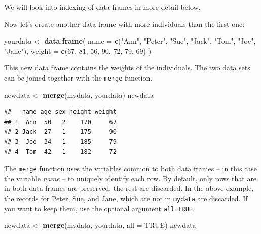 \documentclass[
]{book}
\newenvironment{Shaded}{\begin{snugshade}}{\end{snugshade}}
\newcommand{\AttributeTok}[1]{\textcolor[rgb]{0.13,0.29,0.53}{#1}}
\newcommand{\ConstantTok}[1]{\textcolor[rgb]{0.56,0.35,0.01}{#1}}
\newcommand{\DecValTok}[1]{\textcolor[rgb]{0.00,0.00,0.81}{#1}}
\newcommand{\FunctionTok}[1]{\textcolor[rgb]{0.13,0.29,0.53}{\textbf{#1}}}
\newcommand{\NormalTok}[1]{#1}
\newcommand{\OtherTok}[1]{\textcolor[rgb]{0.56,0.35,0.01}{#1}}
\newcommand{\StringTok}[1]{\textcolor[rgb]{0.31,0.60,0.02}{#1}}
\theoremstyle{definition}
\theoremstyle{definition}
\theoremstyle{definition}
\theoremstyle{definition}
\theoremstyle{remark}
\begin{document}
We will look into indexing of data frames in more detail below.

Now let's create another data frame with more individuals than the
first one:

\begin{Shaded}
\begin{Highlighting}[]
\NormalTok{yourdata }\OtherTok{\textless{}{-}} \FunctionTok{data.frame}\NormalTok{(}
  \AttributeTok{name =} \FunctionTok{c}\NormalTok{(}\StringTok{"Ann"}\NormalTok{, }\StringTok{"Peter"}\NormalTok{, }\StringTok{"Sue"}\NormalTok{, }\StringTok{"Jack"}\NormalTok{, }\StringTok{"Tom"}\NormalTok{, }\StringTok{"Joe"}\NormalTok{, }\StringTok{"Jane"}\NormalTok{),}
  \AttributeTok{weight =} \FunctionTok{c}\NormalTok{(}\DecValTok{67}\NormalTok{, }\DecValTok{81}\NormalTok{, }\DecValTok{56}\NormalTok{, }\DecValTok{90}\NormalTok{, }\DecValTok{72}\NormalTok{, }\DecValTok{79}\NormalTok{, }\DecValTok{69}\NormalTok{)}
\NormalTok{)}
\end{Highlighting}
\end{Shaded}

This new data frame contains the weights of the individuals. The two
data sets can be joined together with the \texttt{merge} function.

\begin{Shaded}
\begin{Highlighting}[]
\NormalTok{newdata }\OtherTok{\textless{}{-}} \FunctionTok{merge}\NormalTok{(mydata, yourdata)}
\NormalTok{newdata}
\end{Highlighting}
\end{Shaded}

\begin{verbatim}
##   name age sex height weight
## 1  Ann  50   2    170     67
## 2 Jack  27   1    175     90
## 3  Joe  34   1    185     79
## 4  Tom  42   1    182     72
\end{verbatim}

The \texttt{merge} function uses the variables common to both data
frames -- in this case the variable \emph{name} -- to uniquely identify
each row. By default, only rows that are in both data frames are
preserved, the rest are discarded. In the above example, the records
for Peter, Sue, and Jane, which are not in \texttt{mydata} are
discarded. If you want to keep them, use the optional argument \texttt{all=TRUE}.

\begin{Shaded}
\begin{Highlighting}[]
\NormalTok{newdata }\OtherTok{\textless{}{-}} \FunctionTok{merge}\NormalTok{(mydata, yourdata, }\AttributeTok{all =} \ConstantTok{TRUE}\NormalTok{)}
\NormalTok{newdata}
\end{Highlighting}
\end{Shaded}
\end{document}
